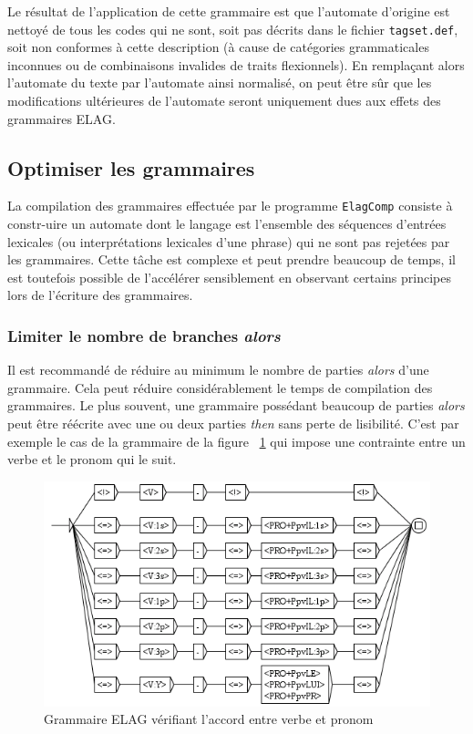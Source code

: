 \bigskip
\noindent Le résultat de l’application de cette grammaire est que l’automate d’origine est nettoyé
de tous les codes qui ne sont, soit pas décrits dans le fichier \verb$tagset.def$,
 soit non conformes
à cette description (à cause de catégories grammaticales inconnues ou de combinaisons invalides 
de traits flexionnels). En remplaçant alors l’automate du texte par l’automate ainsi
normalisé, on peut être sûr que les modifications ultérieures de l’automate seront 
uniquement dues aux effets des grammaires ELAG.


\subsection{Optimiser les grammaires}
La compilation des grammaires effectuée par le programme \verb+ElagComp+
 consiste à constr-uire un automate dont le langage est
l’ensemble des séquences d’entrées lexicales (ou interprétations lexicales d’une phrase) qui ne sont
pas rejetées par les grammaires. Cette tâche est complexe et peut prendre beaucoup de temps, il est
toutefois possible de l’accélérer sensiblement en observant certains principes lors de l’écriture
des grammaires.


\subsubsection{Limiter le nombre de branches \textit{alors}}
\noindent Il est recommandé de réduire au minimum le nombre de parties \textit{alors} d’une grammaire.
Cela peut réduire considérablement le temps de compilation des grammaires. Le plus souvent, 
une grammaire possédant beaucoup de parties \textit{alors} peut être réécrite avec une ou
deux parties \textit{then} sans perte de lisibilité. C’est par exemple le cas de la grammaire 
de la figure ~\ref{fig-NA-bad} qui impose une contrainte entre un verbe et le pronom qui le suit.

\begin{figure}[!h]
\begin{center}
\includegraphics[width=15cm]{resources/img/fig7-21.png}
\caption{Grammaire ELAG vérifiant l’accord entre verbe et pronom\label{fig-NA-bad}}
\end{center}
\end{figure}

